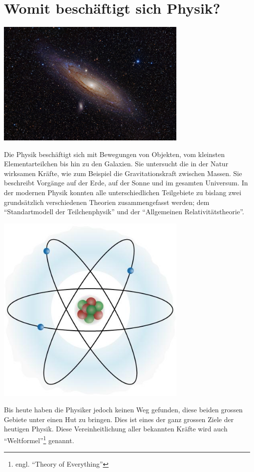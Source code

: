 \section{Womit beschäftigt sich Physik?}
\begin{marginfigure}
    \includegraphics[width=0.7\textwidth]{Bilder/andromeda.jpg}
\end{marginfigure}

Die Physik beschäftigt sich mit Bewegungen von Objekten, vom kleinsten Elementarteilchen bis hin zu den Galaxien. Sie untersucht die in der Natur wirksamen Kräfte, wie zum Beispiel die Gravitationskraft zwischen Massen. Sie beschreibt Vorgänge auf der Erde, auf der Sonne und im gesamten Universum. In der modernen Physik konnten alle unterschiedlichen Teilgebiete zu bislang zwei grundsätzlich verschiedenen Theorien zusammengefasst werden; dem ``Standartmodell der Teilchenphysik'' und der ``Allgemeinen Relativitätstheorie''. 
\begin{marginfigure}
    \includegraphics[width=0.7\textwidth]{Bilder/atom.jpg}
\end{marginfigure}
Bis heute haben die Physiker jedoch keinen Weg gefunden, diese beiden grossen Gebiete unter einen Hut zu bringen. Dies ist eines der ganz grossen Ziele der heutigen Physik. Diese Vereinheitlichung aller bekannten Kräfte wird auch ``Weltformel''\footnote{engl. ``Theory of Everything''} genannt.



